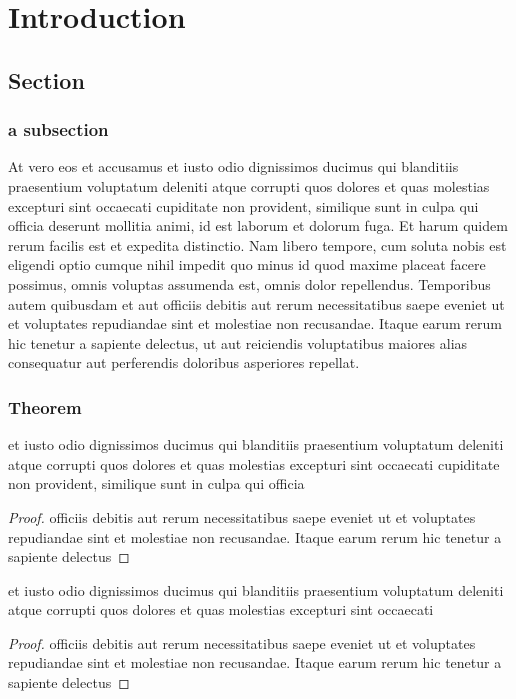 \chapter{Introduction}\label{chp:intro}

\section{Section}
\subsection{a subsection}
At vero eos et accusamus \cite{kimPhasefieldModelBinary1999} et iusto odio dignissimos ducimus qui blanditiis praesentium voluptatum deleniti atque corrupti quos dolores et quas molestias excepturi sint occaecati 
cupiditate non provident, similique sunt in culpa qui officia deserunt mollitia animi, id est laborum et dolorum fuga. Et harum quidem rerum facilis est et expedita distinctio. 
Nam libero tempore, cum soluta nobis est eligendi optio cumque nihil impedit quo minus id quod maxime placeat facere possimus, omnis voluptas assumenda est, omnis dolor repellendus. 
Temporibus autem quibusdam et aut officiis debitis aut rerum necessitatibus saepe eveniet ut et voluptates repudiandae sint et molestiae non recusandae. 
Itaque earum rerum hic tenetur a sapiente delectus, ut aut reiciendis voluptatibus maiores alias consequatur aut perferendis doloribus asperiores repellat.
\subsection{Theorem}

\begin{theorem}
et iusto odio dignissimos ducimus qui blanditiis praesentium voluptatum deleniti atque corrupti quos dolores et quas molestias excepturi sint occaecati 
cupiditate non provident, similique sunt in culpa qui officia
\end{theorem}
\begin{proof}
    officiis debitis aut rerum necessitatibus saepe eveniet ut et voluptates repudiandae sint et molestiae non recusandae. 
Itaque earum rerum hic tenetur a sapiente delectus
\end{proof}

\begin{definition}
    et iusto odio dignissimos ducimus qui blanditiis praesentium voluptatum deleniti atque corrupti quos dolores et quas molestias excepturi sint occaecati 
\end{definition}
\begin{proof}
    officiis debitis aut rerum necessitatibus saepe eveniet ut et voluptates repudiandae sint et molestiae non recusandae. 
Itaque earum rerum hic tenetur a sapiente delectus
\end{proof}

